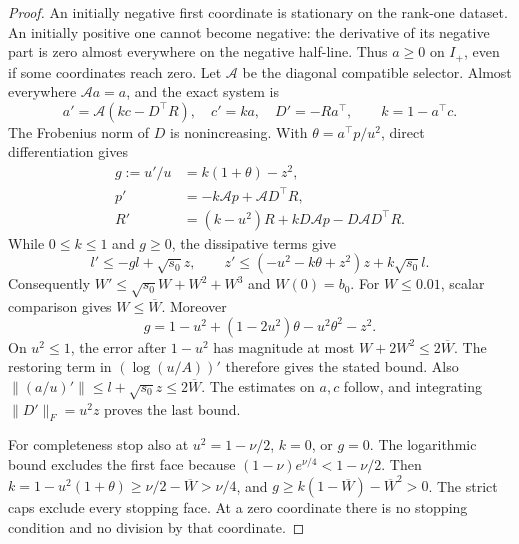 \documentclass[11pt]{article}
\theoremstyle{remark}
\begin{document}
\begin{proof}
An initially negative first coordinate is stationary on the rank-one
dataset. An initially positive one cannot become negative: the derivative
of its negative part is zero almost everywhere on the negative half-line.
Thus $a\ge0$ on $I_+$, even if some coordinates reach zero. Let
$\mathcal A$ be the diagonal compatible selector. Almost everywhere
$\mathcal A a=a$, and the exact system is
\[
 a'=\mathcal A(kc-D^\top R),\quad c'=ka,\quad D'=-Ra^\top,
 \qquad k=1-a^\top c.
\]
The Frobenius norm of $D$ is nonincreasing. With
$\theta=a^\top p/u^2$, direct differentiation gives
\begin{align*}
 g:=u'/u&=k(1+\theta)-z^2,\\
 p'&=-k\mathcal A p+\mathcal A D^\top R,\\
 R'&=(k-u^2)R+kD\mathcal A p-D\mathcal A D^\top R.
\end{align*}
While $0\le k\le1$ and $g\ge0$, the dissipative terms give
\[
 l'\le-gl+\sqrt{s_0}z,\qquad
 z'\le(-u^2-k\theta+z^2)z+k\sqrt{s_0}l.
\]
Consequently $W'\le\sqrt{s_0}W+W^2+W^3$ and $W(0)=b_0$.
For $W\le0.01$, scalar comparison gives $W\le\overline W$.
Moreover
\[
 g=1-u^2+(1-2u^2)\theta-u^2\theta^2-z^2.
\]
On $u^2\le1$, the error after $1-u^2$ has magnitude at most
$W+2W^2\le2\overline W$.
The restoring term in $(\log(u/A))'$ therefore gives the stated bound.
Also
$\|(a/u)'\|\le l+\sqrt{s_0}z\le2\overline W$.
The estimates on $a,c$ follow, and integrating
$\|D'\|_F=u^2z$ proves the last bound.

For completeness stop also at $u^2=1-\nu/2$, $k=0$, or $g=0$.
The logarithmic bound excludes the first face because
$(1-\nu)e^{\nu/4}<1-\nu/2$.
Then $k=1-u^2(1+\theta)\ge\nu/2-\overline W>\nu/4$,
and $g\ge k(1-\overline W)-\overline W^2>0$.
The strict caps exclude every stopping face. At a zero coordinate there
is no stopping condition and no division by that coordinate.
\end{proof}
\end{document}
